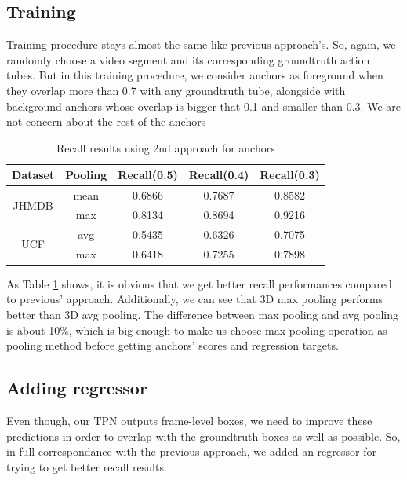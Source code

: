 \subsection{Training}
Training procedure stays almost the same like previous approach's. So, again, we randomly choose  a video segment and its corresponding groundtruth action tubes. But in this training procedure,
we consider anchors as foreground when they overlap more than 0.7 with any groundtruth tube, alongside with background anchors whose overlap is bigger that 0.1 and smaller than 0.3. We are not
concern about the rest of the anchors

\begin{table}[h]
  \centering
  \begin{tabular}{||c | c || c  c c||}
    \hline
    \textbf{Dataset} & \textbf{Pooling} &  \textbf{Recall(0.5)} & \textbf{Recall(0.4)} & \textbf{Recall(0.3)} \\
    \hline  \hline
    \multirow{2}{4em}{JHMDB} & mean & 0.6866 & 0.7687 & 0.8582 \\
    \cline{2-5}
    {} & max &  0.8134 & 0.8694 & 0.9216 \\
    \hline
    \multirow{2}{4em}{UCF} & avg &  0.5435 & 0.6326 & 0.7075 \\
    \cline{2-5}
    {} & max & 0.6418 & 0.7255 & 0.7898 \\
    \hline
  \end{tabular}
  \caption{Recall results using 2nd approach for anchors}
  \label{table:tpn_2_1}
\end{table}

As Table \ref{table:tpn_2_1} shows, it is obvious that we get better recall performances compared to previous' approach.
Additionally, we can see that 3D max pooling performs better than 3D avg pooling. The difference
between max pooling and avg pooling is about 10\%, which is big enough to make us choose max pooling operation as pooling method before getting anchors' scores
and regression targets.

\subsection{Adding regressor}

Even though, our TPN outputs frame-level boxes, we need to improve these predictions in order to overlap
with the groundtruth boxes as well as possible.
So, in full correspondance with the previous approach, we added an regressor for trying to get better recall results.

